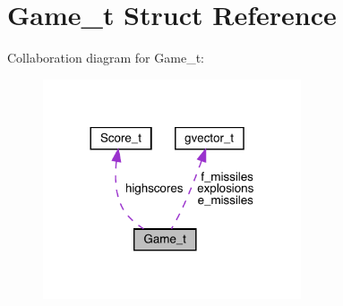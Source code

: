 \hypertarget{struct_game__t}{}\section{Game\+\_\+t Struct Reference}
\label{struct_game__t}


Collaboration diagram for Game\+\_\+t\+:\nopagebreak
\begin{figure}[H]
\begin{center}
\leavevmode
\includegraphics[width=216pt]{struct_game__t__coll__graph}
\end{center}
\end{figure}
